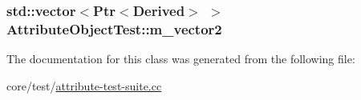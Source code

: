 \subsubsection[{\texorpdfstring{m\+\_\+vector2}{m_vector2}}]{\setlength{\rightskip}{0pt plus 5cm}std\+::vector$<${\bf Ptr}$<${\bf Derived}$>$ $>$ Attribute\+Object\+Test\+::m\+\_\+vector2\hspace{0.3cm}{\ttfamily [private]}}\hypertarget{classAttributeObjectTest_ae9b70d67367448bc838d64f98a53a9d7}{}\label{classAttributeObjectTest_ae9b70d67367448bc838d64f98a53a9d7}


The documentation for this class was generated from the following file\+:\begin{DoxyCompactItemize}
\item 
core/test/\hyperlink{attribute-test-suite_8cc}{attribute-\/test-\/suite.\+cc}\end{DoxyCompactItemize}
